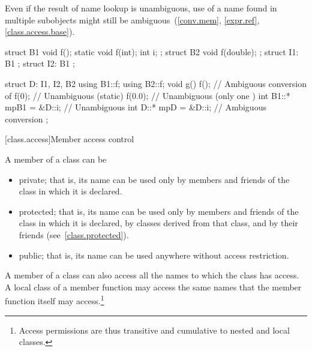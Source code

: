 \pnum
\begin{note}
Even if the result of name lookup is unambiguous, use of a name found in
multiple subobjects might still be
ambiguous~(\ref{conv.mem}, \ref{expr.ref}, \ref{class.access.base}).\end{note}
\begin{example}
\begin{codeblock}
struct B1 {
  void f();
  static void f(int);
  int i;
};
struct B2 {
  void f(double);
};
struct I1: B1 { };
struct I2: B1 { };

struct D: I1, I2, B2 {
  using B1::f;
  using B2::f;
  void g() {
    f();                        // Ambiguous conversion of 
    f(0);                       // Unambiguous (static)
    f(0.0);                     // Unambiguous (only one )
    int B1::* mpB1 = &D::i;     // Unambiguous
    int D::* mpD = &D::i;       // Ambiguous conversion
  }
};
\end{codeblock}\end{example}

[class.access]{Member access control}%


\pnum
A member of a class can be
\begin{itemize}
\item
{}%
private;
that is, its name can be used only by members and friends
of the class in which it is declared.
\item
{}%
protected;
that is, its name can be used only by members and friends
of the class in which it is declared, by classes derived from that class, and by their
friends (see~\ref{class.protected}).
\item
{}%
public;
that is, its name can be used anywhere without access restriction.
\end{itemize}

\pnum
A member of a class can also access all the names to which the class has access.
A local class of a member function may access
the same names that the member function itself may access.\footnote{Access
permissions are thus transitive and cumulative to nested
and local classes.}

